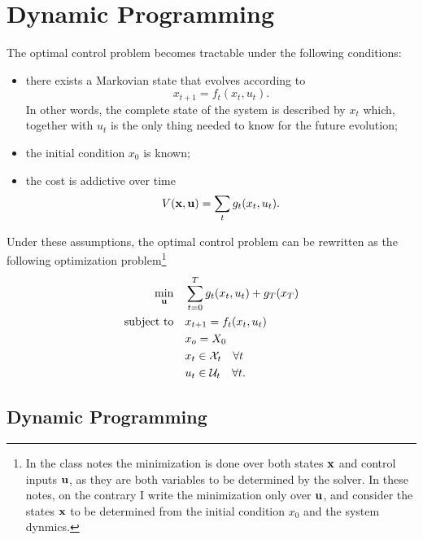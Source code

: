 \section{Dynamic Programming}
\label{sec:bellmans-principle}

The optimal control problem becomes tractable under the following conditions:
\begin{itemize}
\item there exists a Markovian state that evolves according to
  \begin{equation*}
    x_{t+1} = f_t(x_t,u_t).
  \end{equation*}
  In other words, the complete state of the system is described by $x_t$ which, together with $u_t$ is the only thing needed to know for the future evolution;
\item the initial condition $x_0$ is known;
\item the cost is addictive over time
  \begin{equation*}
    V(\boldsymbol{\mathrm{x}},\boldsymbol{\mathrm{u}}) = \sum_t g_t(x_t,u_t).
  \end{equation*}
\end{itemize}
Under these assumptions, the optimal control problem can be rewritten as the following optimization problem\footnote{In the class notes the minimization is done over both states $\boldsymbol{\mathrm{x}}$ and control inputs $\boldsymbol{\mathrm{u}}$, as they are both variables to be determined by the solver. In these notes, on the contrary I write the minimization only over $\boldsymbol{\mathrm{u}}$, and consider the states $\boldsymbol{\mathrm{x}}$ to be determined from the initial condition $x_0$ and the system dynmics.}
\begin{equation}
  \label{eq:general-optimization-problem}
  \begin{aligned}
    \min_{\boldsymbol{\mathrm{u}}} \quad & \sum_{t=0}^T g_t(x_t,u_t) + g_T(x_T) \\
    \text{subject to} \quad  & x_{t+1} = f_t(x_t,u_t)\\
                              & x_o=X_0 \\
                              &x_t \in \mathcal{X}_t\quad \forall t \\
                              &u_t \in \mathcal{U}_t\quad \forall t.
  \end{aligned}
\end{equation}


\subsection{Dynamic Programming}
\label{sec:dynamic-programming}

